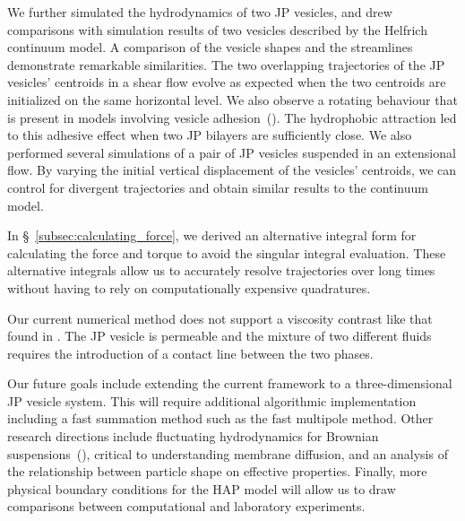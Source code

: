 \documentclass[lineno]{jfm}
\begin{document}

We further simulated the hydrodynamics of two JP vesicles, and drew
comparisons with simulation results of two vesicles described by the
Helfrich continuum model. A comparison of the vesicle shapes and the
streamlines demonstrate remarkable similarities. The two overlapping
trajectories of the JP vesicles' centroids in a shear flow evolve as
expected when the two centroids are initialized on the same horizontal
level. We also observe a rotating behaviour that is present in models
involving vesicle adhesion~(\cite{qua-vee-you2019}). The hydrophobic
attraction led to this adhesive effect when two JP bilayers are
sufficiently close. We also performed several simulations of a pair of
JP vesicles suspended in an extensional flow. By varying the initial
vertical displacement of the vesicles' centroids, we can control for
divergent trajectories and obtain similar results to the continuum
model.

In \S~\ref{subsec:calculating_force}, we derived an alternative integral
form for calculating the force and torque to avoid the singular integral
evaluation. These alternative integrals allow us to accurately resolve
trajectories over long times without having to rely on computationally
expensive quadratures.

Our current numerical method does not support a viscosity contrast
like that found in
\citep{PhysRevLett.106.158103,
  PhysRevE.75.016313,
  Kaoui2016}.
The JP vesicle is permeable and the mixture of two different
fluids requires the introduction of a contact line between
the two phases.

Our future goals include extending the current framework to a
three-dimensional JP vesicle system. This will require additional
algorithmic implementation including a fast summation method such as the
fast multipole method. Other research directions include
fluctuating hydrodynamics for Brownian suspensions~(\cite{Bao2018}),
critical to understanding membrane diffusion,
and an analysis of the relationship between particle shape on effective
properties.
Finally, more
physical boundary conditions for the HAP model will allow us to draw
comparisons between computational and laboratory experiments.\\
\end{document}
